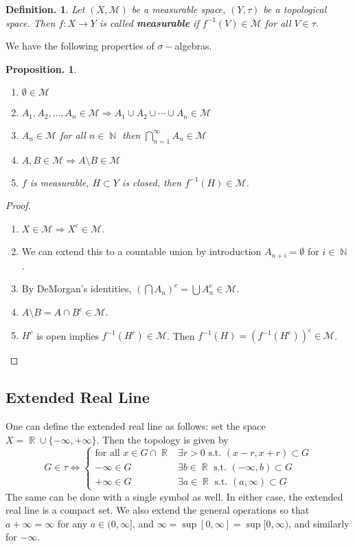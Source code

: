 \documentclass[11pt, a4paper]{memoir}
\DeclareMathOperator{\N}{{\mathbb{N}}}
\DeclareMathOperator{\R}{{\mathbb{R}}}
\theoremstyle{change}
\newtheorem{proposition}[theorem]{Proposition.}
\theoremstyle{plain}
\theoremstyle{nonumberplain}
\newtheorem{definition}{Definition.}
\newtheorem{proof}{Proof}
\numberwithin{equation}{section}
\begin{document}
\begin{definition}
    Let $(X,\mathcal{M})$ be a measurable space, $(Y,\tau)$ be a topological space.
    Then $f:X\to Y$ is called \textbf{measurable} if $f^{-1}(V)\in\mathcal{M}$ for all $V\in\tau$.
\end{definition}
We have the following properties of $\sigma-$algebras.
\begin{proposition}
    \begin{enumerate}[nolistsep]
        \item $\emptyset\in\mathcal{M}$
        \item $A_1,A_2,\ldots,A_n\in\mathcal{M}\Rightarrow A_1\cup A_2\cup\cdots \cup A_n\in\mathcal{M}$
        \item $A_n\in\mathcal{M}$ for all $n\in\N$ then $\bigcap_{n=1}^\infty A_n\in\mathcal{M}$
        \item $A,B\in\mathcal{M}\Rightarrow A\setminus B\in\mathcal{M}$
        \item $f$ is measurable, $H\subset Y$ is closed, then $f^{-1}(H)\in\mathcal{M}$.
    \end{enumerate}
\end{proposition}
\begin{proof}
    \begin{enumerate}[nolistsep]
        \item $X\in\mathcal{M}\Rightarrow X^c\in\mathcal{M}$.
        \item We can extend this to a countable union by introduction $A_{n+i}=\emptyset$ for $i\in\N$.
        \item By DeMorgan's identities, $(\bigcap A_n)^c=\bigcup A_n^c\in\mathcal{M}$.
        \item $A\setminus B=A\cap B^c\in\mathcal{M}$.
        \item $H^c$ is open implies $f^{-1}(H^c)\in\mathcal{M}$.
            Then $f^{-1}(H)=(f^{-1}(H^c))^c\in\mathcal{M}$.
    \end{enumerate}
\end{proof}
\subsection{Extended Real Line}
One can define the extended real line as follows: set the space $X=\R\cup\{-\infty,+\infty\}$.
Then the topology is given by
\begin{equation*}
    G\in\tau\Leftrightarrow
    \begin{cases}
        \text{for all } x\in G\cap\R & \exists r>0 \text{ s.t. } (x-r,x+r)\subset G\\
        -\infty\in G & \exists b\in\R \text{ s.t. }(-\infty,b)\subset G\\
        +\infty\in G & \exists a\in\R \text{ s.t. }(a,\infty)\subset G
    \end{cases}
\end{equation*}
The same can be done with a single symbol as well.
In either case, the extended real line is a compact set.
We also extend the general operations so that $a+\infty=\infty$ for any $a\in(0,\infty]$, and $\infty=\sup[0,\infty]=\sup[0,\infty)$, and similarly for $-\infty$.
\end{document}
